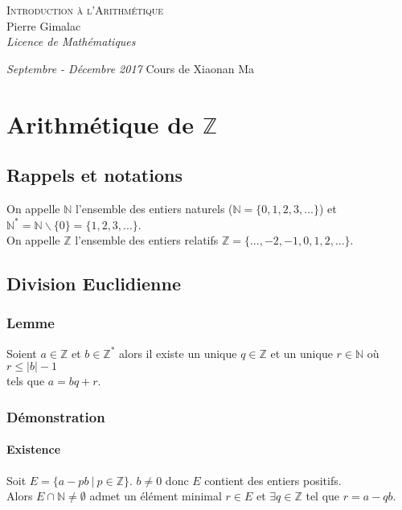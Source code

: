 \documentclass[a4paper,10pt]{book} %
\newcommand{\N}{\mathbb{N}}
\newcommand{\Z}{\mathbb{Z}}
\newcommand{\tq}{~|~}
\begin{document}
\begin{titlepage}
\thispagestyle{empty}
\begin{center}
\vspace*{7cm}
\Huge \textsc{Introduction à l'Arithmétique}\\
\vspace{1.5cm}
\Large Pierre Gimalac\\
\vspace{0.5cm}
\large \textit{Licence de Mathématiques}
\vfill
\end{center}
\large \textit{Septembre - Décembre 2017}
\hfill 
\large Cours de Xiaonan Ma
\restoregeometry
\end{titlepage}

\renewcommand{\contentsname}{Sommaire}
\thispagestyle{empty}
\tableofcontents
\thispagestyle{empty}

\chapter{Arithmétique de $\Z$}
\section*{Rappels et notations}
On appelle $\N$ l'ensemble des entiers naturels ($\N=\{0,1,2,3,...\}$) et $\N^*=\N\backslash\{0\}=\{1,2,3,...\}$.\\
On appelle $\Z$ l'ensemble des entiers relatifs $\Z=\{...,-2,-1,0,1,2,...\}$.

\section{Division Euclidienne}
\subsection{Lemme}
Soient $a\in \Z$ et $b\in \Z^*$ alors il existe un unique $q\in \Z$ et un unique $r\in \N$ où $r\leq |b|-1$\\
tels que $a=bq+r$.

\subsection{Démonstration}
\subsubsection{Existence}
Soit $E=\{a-pb \tq p\in \Z\}$. $b\neq 0$ donc $E$ contient des entiers positifs.\\
Alors $E\cap \N\neq \emptyset$ admet un élément minimal $r\in E$ et $\exists q\in \Z$ tel que $r=a-qb$.\\
\end{document}
